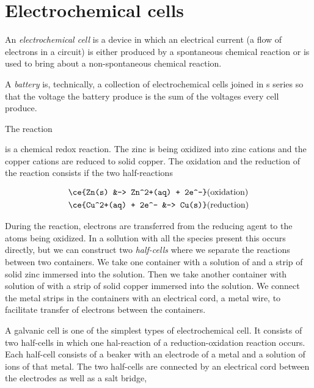 \documentclass[../mit-general-chemistry.tex]{subfiles}
\begin{document}
\section{Electrochemical cells}


\begin{definition}
  An {\em electrochemical cell} is a device in which an electrical
  current (a flow of electrons in a circuit) is either produced by a
  spontaneous chemical reaction or is used to bring about a
  non-spontaneous chemical reaction.
\end{definition}

\begin{definition}
  A {\em battery} is, technically, a collection of electrochemical
  cells joined in s series so that the voltage the battery produce is
  the sum of the voltages every cell produce.
\end{definition}



The reaction


is a chemical redox reaction. The zinc is being oxidized into zinc
cations and the copper cations are reduced to solid copper. The
oxidation and the reduction of the reaction consists if the two
half-reactions

\begin{align}
  \ce{Zn(s) &-> Zn^2+(aq) + 2e^-} &\text{(oxidation)}\\
  \ce{Cu^2+(aq) + 2e^- &-> Cu(s)} &\text{(reduction)}
\end{align}


During the reaction, electrons are transferred from the reducing agent
to the atoms being oxidized. In a sollution with all the species
present this occurs directly, but we can construct two {\em
  half-cells} where we separate the reactions between two
containers. We take one container with a solution of  and a
strip of solid zinc immersed into the solution. Then we take another
container with solution of  with a strip of solid copper
immersed into the solution. We connect the metal strips in the
containers with an electrical cord, a metal wire, to facilitate
transfer of electrons between the containers.



A galvanic cell is one of the simplest types of electrochemical
cell. It consists of two half-cells in which one hal-reaction of a
reduction-oxidation reaction occurs. Each half-cell consists of a
beaker with an electrode of a metal and a solution of ions of that
metal. The two half-cells are connected by an electrical cord
between the electrodes as well as a salt bridge,
\end{document}
